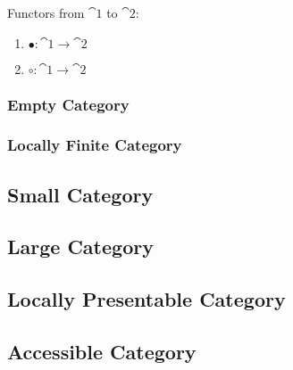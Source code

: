 Functors from $\cat{1}$ to $\cat{2}$:
\begin{enumerate}
  \item $\bullet : \cat{1} \rightarrow \cat{2}$
  \item $\circ : \cat{1} \rightarrow \cat{2}$
\end{enumerate}



\subsubsection{Empty Category}\label{sec:empty_category}

\subsubsection{Locally Finite Category}
\label{sec:locally_finite_category}



\subsection{Small Category}\label{sec:small_category}

\subsection{Large Category}\label{sec:large_category}

\subsection{Locally Presentable Category}\label{sec:locally_presentable}

\subsection{Accessible Category}\label{sec:accessible_category}

